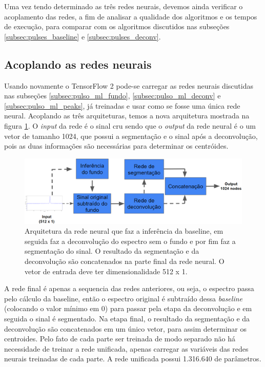 \documentclass[a4paper,12pt,oneside]{book}
\begin{document}
\par Uma vez tendo determinado as três redes neurais, devemos ainda verificar o acoplamento das redes, a fim de analisar a qualidade dos algoritmos e os tempos de execução, para comparar com os algoritmos discutidos nas subseções \ref{subsec:pulses_baseline} e \ref{subsec:pulses_deconv}.


\subsection{Acoplando as redes neurais}

\par Usando novamente o TensorFlow 2 pode-se carregar as redes neurais discutidas nas subseções \ref{subsec:pulso_ml_fundo}, \ref{subsec:pulso_ml_deconv} e \ref{subsec:pulso_ml_peaks}, já treinadas e usar como se fosse uma única rede neural. Acoplando as três arquiteturas, temos a nova arquitetura mostrada na figura \ref{fig:arq:source_to_segmentation}. O \textit{input} da rede é o sinal cru sendo que o \textit{output} da rede neural é o um vetor de tamanho 1024, que possui a segmentação e o sinal após a deconvolução, pois as duas informações são necessárias para determinar os centróides.

\begin{figure}[H]
    \centering
    \includegraphics[scale = 0.35]{figs/arq_source_segmentation.png}
    \caption{Arquitetura da rede neural que faz a inferência da baseline, em seguida faz a deconvolução do espectro sem o fundo e por fim faz a segmentação do sinal. O resultado da segmentação e da deconvolução são concatenados na parte final da rede neural. O vetor de entrada deve ter dimensionalidade 512 x 1.}
    \label{fig:arq:source_to_segmentation}
\end{figure}

\par A rede final é apenas a sequencia das redes anteriores, ou seja, o espectro passa pelo cálculo da baseline, então o espectro original é subtraído dessa \textit{baseline} (colocando o valor mínimo em 0) para passar pela etapa da deconvolução e em seguida o sinal é segmentado. Na etapa final, o resultado da segmentação e da deconvolução são concatenados em um único vetor, para assim determinar os centroides. Pelo fato de cada parte ser treinada de modo separado não há necessidade de treinar a rede unificada, apenas carregar as variáveis das redes neurais treinadas de cada parte. A rede unificada possui 1.316.640 de parâmetros.
\end{document}
